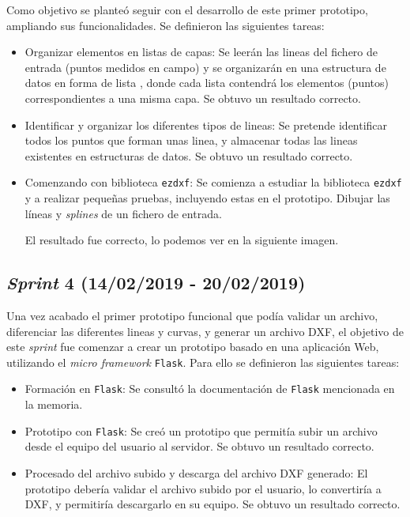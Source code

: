 Como objetivo se planteó seguir con el desarrollo de este primer prototipo, ampliando sus funcionalidades. Se definieron las siguientes tareas:

\begin{itemize}
\item Organizar elementos en listas de capas: Se leerán las lineas del fichero de entrada (puntos medidos en campo) y se organizarán en una estructura de datos en forma de lista , donde cada lista contendrá los elementos (puntos) correspondientes a una misma capa. Se obtuvo un resultado correcto.

\item Identificar y organizar los diferentes tipos de lineas: Se pretende identificar todos los puntos que forman unas linea, y almacenar todas las lineas existentes en estructuras de datos. Se obtuvo un resultado correcto.

\item Comenzando con biblioteca \texttt{ezdxf}: Se comienza a estudiar la biblioteca \texttt{ezdxf} y a realizar pequeñas pruebas, incluyendo estas en el prototipo. Dibujar las líneas y \emph{splines} de un fichero de entrada.

El resultado fue correcto, lo podemos ver en la siguiente imagen.

\end{itemize}




\subsection{\emph{Sprint} 4 (14/02/2019 - 20/02/2019)}

Una vez acabado el primer prototipo funcional que podía validar un archivo, diferenciar las diferentes lineas y curvas, y generar un archivo DXF, el objetivo de este \emph{sprint} fue comenzar a crear un prototipo  basado en una aplicación Web, utilizando el \emph{micro framework} \texttt{Flask}. Para ello se definieron las siguientes tareas:

\begin{itemize}
\item Formación en \texttt{Flask}: Se consultó la documentación de \texttt{Flask} mencionada en la memoria.

\item Prototipo con \texttt{Flask}: Se creó un prototipo que permitía subir un archivo desde el equipo del usuario al servidor. Se obtuvo un resultado correcto.

\item Procesado del archivo subido y descarga del archivo DXF generado: El prototipo debería validar el archivo subido por el usuario, lo convertiría a DXF, y permitiría descargarlo en su equipo. Se obtuvo un resultado correcto.

\end{itemize}
 
